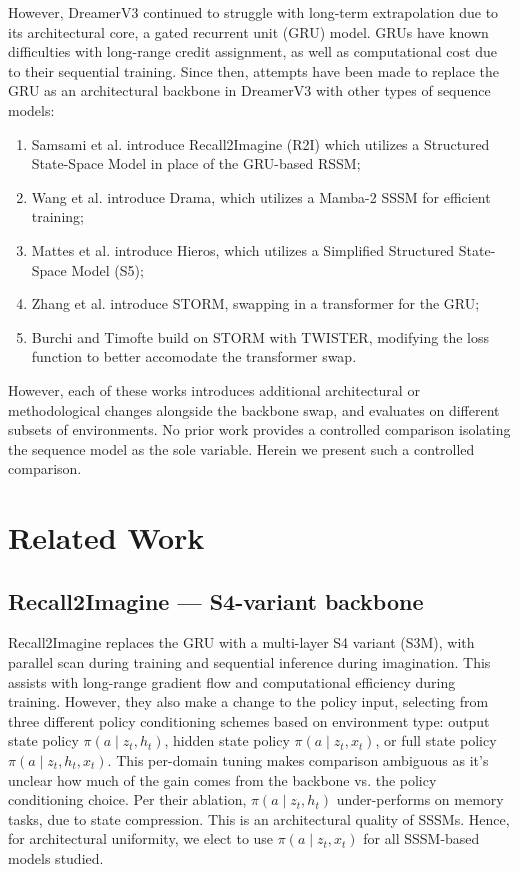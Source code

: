 \documentclass{article}
\begin{document}
However, DreamerV3 continued to struggle with long-term extrapolation due to its architectural core\cite{memory}, a gated recurrent unit (GRU) model. GRUs have known difficulties with long-range credit assignment, as well as computational cost due to their sequential training. Since then, attempts have been made to replace the GRU as an architectural backbone in DreamerV3 with other types of sequence models:
\begin{enumerate}
    \item Samsami et al.\cite{memory} introduce Recall2Imagine (R2I) which utilizes a Structured State-Space Model in place of the GRU-based RSSM;
    \item Wang et al.\cite{drama} introduce Drama, which utilizes a Mamba-2\cite{mamba2} SSSM for efficient training;
    \item Mattes et al.\cite{hieros} introduce Hieros, which utilizes a Simplified Structured State-Space Model (S5)\cite{s5};
    \item Zhang et al.\cite{storm} introduce STORM, swapping in a transformer for the GRU;
    \item Burchi and Timofte\cite{twister} build on STORM with TWISTER, modifying the loss function to better accomodate the transformer swap.
\end{enumerate}

However, each of these works introduces additional architectural or methodological changes alongside the backbone swap, and evaluates on different subsets of environments. No prior work provides a controlled comparison isolating the sequence model as the sole variable. Herein we present such a controlled comparison.

\section{Related Work}
\subsection{Recall2Imagine --- S4-variant backbone}
Recall2Imagine\cite{memory} replaces the GRU with a multi-layer S4 variant (S3M), with parallel scan during training and sequential inference during imagination. This assists with long-range gradient flow and computational efficiency during training. However, they also make a change to the policy input, selecting from three different policy conditioning schemes based on environment type: output state policy \(\pi(a \mid z_t, h_t)\), hidden state policy \(\pi(a \mid z_t, x_t)\), or full state policy \(\pi(a \mid z_t, h_t, x_t)\). This per-domain tuning makes comparison ambiguous as it's unclear how much of the gain comes from the backbone vs. the policy conditioning choice. Per their ablation, \(\pi(a \mid z_t, h_t)\) under-performs on memory tasks, due to state compression. This is an architectural quality of SSSMs. Hence, for architectural uniformity, we elect to use \(\pi(a \mid z_t,x_t)\) for all SSSM-based models studied.
\end{document}
